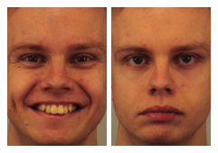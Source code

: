 \documentclass[a4paper]{article}
\begin{document}
\begin{figure}
\begin{center}
\begin{subfigure}{0.26\textwidth}
    \end{subfigure}
    \hfill
    \begin{subfigure}{0.26\textwidth}
    \end{subfigure}
    \hfill
    \begin{subfigure}{0.18\textwidth}
      \includegraphics[width=0.32\textwidth]{figures/AM05HAS.JPG}%
      \includegraphics[width=0.32\textwidth]{figures/AM05NES.JPG}%

\end{subfigure}
\end{center}
\end{figure}
\end{document}
